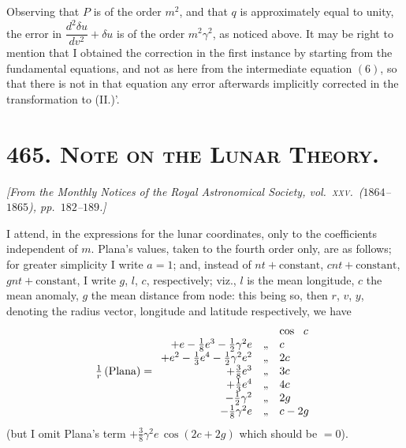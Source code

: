 \documentclass[11pt]{article}
\begin{document}
Observing that $P$ is of the order $m^{2}$, and that $q$ is
approximately equal to unity, the error in
$\dfrac{d^{2}\delta u}{dv^{2}} + \delta u$ is of the order
$m^{2}\gamma^{2}$, as noticed above. It may be right to mention that I
obtained the correction in the first instance by starting from the
fundamental equations, and not as here from the intermediate equation
$(6)$, so that there is not in that equation any error afterwards
implicitly corrected in the transformation to (II.)'.

\section*{465. \textsc{Note on the Lunar Theory.}}

\begin{center}
\textit{[From the Monthly Notices of the Royal Astronomical Society,
vol.\ \textsc{xxv}.\ ($1864$--$1865$), pp.\ $182$--$189$.]}
\end{center}

\medskip

I attend, in the expressions for the lunar coordinates, only to the
coefficients independent of $m$. Plana's values, taken to the fourth
order only, are as follows; for greater simplicity I write $a = 1$;
and, instead of $nt + \text{constant}$, $cnt + \text{constant}$,
$gnt + \text{constant}$, I write $g$, $l$, $c$, respectively; viz.,
$l$ is the mean longitude, $c$ the mean anomaly, $g$ the mean distance
from node: this being so, then $r$, $v$, $y$, denoting the radius
vector, longitude and latitude respectively, we have
\[
\tfrac{1}{r}\,(\text{Plana}) =
\begin{array}{r@{\quad}l@{\quad}l}
 & & \cos\ \ c \\
 + e - \tfrac{1}{8}e^{3} - \tfrac{1}{2}\gamma^{2}e & \text{,,} & c\\
 + e^{2} - \tfrac{1}{3}e^{4} - \tfrac{1}{2}\gamma^{2}e^{2} & \text{,,} & 2c\\
 + \tfrac{3}{8}e^{3} & \text{,,} & 3c\\
 + \tfrac{1}{3}e^{4} & \text{,,} & 4c\\
 - \tfrac{1}{2}\gamma^{2} & \text{,,} & 2g\\
 - \tfrac{1}{8}\gamma^{2}e & \text{,,} & c - 2g
\end{array}
\]
(but I omit Plana's term $+ \tfrac{3}{8}\gamma^{2}e\,\cos(2c+2g)$ which
should be $=0$).
\end{document}
